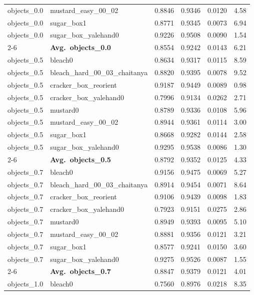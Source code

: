 \begin{longtable}{llrrrr}
  objects_0.0 & mustard\_easy\_00\_02 & 0.8846 & 0.9346 & 0.0120 & 4.58 \\
  objects_0.0 & sugar\_box1 & 0.8771 & 0.9345 & 0.0073 & 6.94 \\
  objects_0.0 & sugar\_box\_yalehand0 & 0.9226 & 0.9508 & 0.0090 & 1.54 \\
  \cmidrule{2-6}
  & \textbf{Avg.~objects_0.0} & 0.8554 & 0.9242 & 0.0143 & 6.21 \\
  \midrule
  objects_0.5 & bleach0 & 0.8634 & 0.9317 & 0.0115 & 8.59 \\
  objects_0.5 & bleach\_hard\_00\_03\_chaitanya & 0.8820 & 0.9395 & 0.0078 & 9.52 \\
  objects_0.5 & cracker\_box\_reorient & 0.9187 & 0.9449 & 0.0089 & 0.98 \\
  objects_0.5 & cracker\_box\_yalehand0 & 0.7996 & 0.9134 & 0.0262 & 2.71 \\
  objects_0.5 & mustard0 & 0.8789 & 0.9336 & 0.0108 & 5.96 \\
  objects_0.5 & mustard\_easy\_00\_02 & 0.8944 & 0.9361 & 0.0114 & 3.00 \\
  objects_0.5 & sugar\_box1 & 0.8668 & 0.9282 & 0.0144 & 2.58 \\
  objects_0.5 & sugar\_box\_yalehand0 & 0.9295 & 0.9538 & 0.0086 & 1.30 \\
  \cmidrule{2-6}
  & \textbf{Avg.~objects_0.5} & 0.8792 & 0.9352 & 0.0125 & 4.33 \\
  \midrule
  objects_0.7 & bleach0 & 0.9156 & 0.9475 & 0.0069 & 5.27 \\
  objects_0.7 & bleach\_hard\_00\_03\_chaitanya & 0.8914 & 0.9454 & 0.0071 & 8.64 \\
  objects_0.7 & cracker\_box\_reorient & 0.9106 & 0.9439 & 0.0098 & 1.83 \\
  objects_0.7 & cracker\_box\_yalehand0 & 0.7923 & 0.9151 & 0.0275 & 2.86 \\
  objects_0.7 & mustard0 & 0.8949 & 0.9393 & 0.0095 & 5.10 \\
  objects_0.7 & mustard\_easy\_00\_02 & 0.8881 & 0.9356 & 0.0121 & 3.21 \\
  objects_0.7 & sugar\_box1 & 0.8577 & 0.9241 & 0.0150 & 3.60 \\
  objects_0.7 & sugar\_box\_yalehand0 & 0.9275 & 0.9526 & 0.0087 & 1.55 \\
  \cmidrule{2-6}
  & \textbf{Avg.~objects_0.7} & 0.8847 & 0.9379 & 0.0121 & 4.01 \\
  \midrule
  objects_1.0 & bleach0 & 0.7560 & 0.8976 & 0.0218 & 8.35 \\

\end{longtable}

